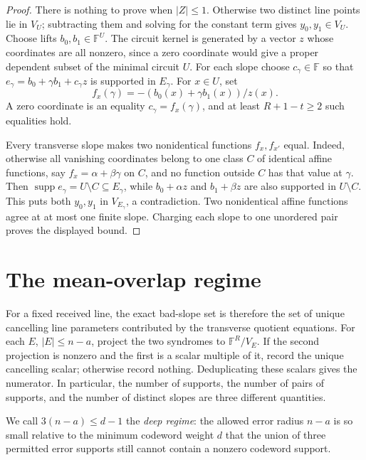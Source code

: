 \documentclass[11pt,a4paper]{amsart}
\numberwithin{equation}{section}
\theoremstyle{remark}
\DeclareMathOperator{\supp}{supp}
\newcommand{\F}{\mathbb F}
\newcommand{\abs}[1]{\lvert #1\rvert}
\begin{document}
\begin{proof}
There is nothing to prove when \(\abs Z\le1\).  Otherwise two distinct
line points lie in \(V_U\); subtracting them and solving for the constant
term gives \(y_0,y_1\in V_U\).  Choose lifts
\(b_0,b_1\in\F^U\).  The circuit kernel is generated by a vector
\(z\) whose coordinates are all nonzero, since a zero coordinate would
give a proper dependent subset of the minimal circuit \(U\).  For each slope choose
\(c_\gamma\in\F\) so that
\(e_\gamma=b_0+\gamma b_1+c_\gamma z\) is supported in
\(E_\gamma\).  For \(x\in U\), set
\[
             f_x(\gamma)=-(b_0(x)+\gamma b_1(x))/z(x).
\]
A zero coordinate is an equality \(c_\gamma=f_x(\gamma)\), and at least
\(R+1-t\ge2\) such equalities hold.

Every transverse slope makes two nonidentical functions \(f_x,f_{x'}\)
equal.  Indeed, otherwise all vanishing coordinates belong to one class
\(C\) of identical affine functions, say
\(f_x=\alpha+\beta\gamma\) on \(C\), and no function outside \(C\) has
that value at \(\gamma\).  Then
\(\supp e_\gamma=U\setminus C\subseteq E_\gamma\), while
\(b_0+\alpha z\) and \(b_1+\beta z\) are also supported in
\(U\setminus C\).  This puts both \(y_0,y_1\) in \(V_{E_\gamma}\), a
contradiction.  Two nonidentical affine functions agree at at most one
finite slope.  Charging each slope to one unordered pair proves the
displayed bound.
\end{proof}



\section{The mean-overlap regime}\label{sec:mean-overlap}

For a fixed received line, the exact bad-slope set is therefore the set of
unique cancelling line parameters contributed by the transverse quotient
equations.  For each \(E\), \(\abs E\le n-a\), project the two
syndromes to \(\F^R/V_E\).  If the second projection is nonzero and the
first is a scalar multiple of it, record the unique cancelling scalar;
otherwise record nothing.  Deduplicating these scalars gives the numerator.
In particular, the number of supports, the number of pairs of supports, and
the number of distinct slopes are three different quantities.

We call \(3(n-a)\le d-1\) the \emph{deep regime}: the allowed error
radius \(n-a\) is so small relative to the minimum codeword weight \(d\)
that the union of three permitted error supports still cannot contain a
nonzero codeword support.
\end{document}
